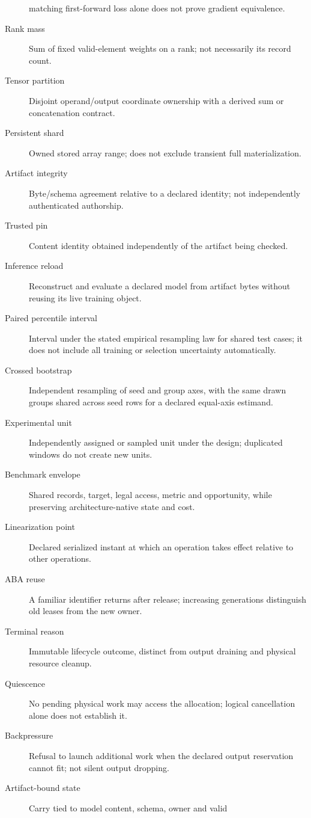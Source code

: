 \begin{description}
matching first-forward loss alone does not prove gradient equivalence.
\item[Rank mass] Sum of fixed valid-element weights on a rank; not necessarily its record count.
\item[Tensor partition] Disjoint operand/output coordinate ownership with a derived sum or concatenation contract.
\item[Persistent shard] Owned stored array range; does not exclude transient full materialization.
\item[Artifact integrity] Byte/schema agreement relative to a declared identity; not independently authenticated authorship.
\item[Trusted pin] Content identity obtained independently of the artifact being checked.
\item[Inference reload] Reconstruct and evaluate a declared model from artifact bytes without reusing its live training object.
\item[Paired percentile interval] Interval under the stated empirical resampling law for shared test cases; it does not include all training or selection uncertainty automatically.
\item[Crossed bootstrap] Independent resampling of seed and group axes, with the same drawn groups shared across seed rows for a declared equal-axis estimand.
\item[Experimental unit] Independently assigned or sampled unit under the design; duplicated windows do not create new units.
\item[Benchmark envelope] Shared records, target, legal access, metric and opportunity, while preserving architecture-native state and cost.
\item[Linearization point] Declared serialized instant at which an operation takes effect relative to other operations.
\item[ABA reuse] A familiar identifier returns after release; increasing generations distinguish old leases from the new owner.
\item[Terminal reason] Immutable lifecycle outcome, distinct from output draining and physical resource cleanup.
\item[Quiescence] No pending physical work may access the allocation; logical cancellation alone does not establish it.
\item[Backpressure] Refusal to launch additional work when the declared output reservation cannot fit; not silent output dropping.
\item[Artifact-bound state] Carry tied to model content, schema, owner and valid

\end{description}
